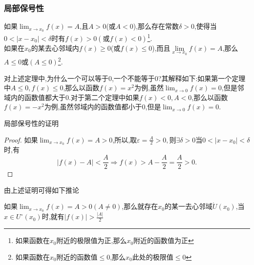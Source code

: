 \documentclass[12pt, a4paper, oneside, UTF8]{ctexbook}  %
\begin{document}
\begin{sloppypar}
    \subsubsection{局部保号性}
    \begin{them}{}{}
        如果$\lim_{x\to x_0}f(x)=A$,且$A>0$(或$A<0$),那么存在常数$\delta>0$,使得当$0<|x-x_0|<\delta$时有$f(x)>0(或f(x)<0)$\footnote{如果函数在$x_0$附近的极限值为正,那么$x_0$附近的函数值为正}.
        \\
        如果在$x_0$的某去心邻域内$f(x)\geqslant 0$(或$f(x)\leqslant 0$),而且$\underset{x\to x_0}{\operatorname*{lim}}f(x)=A$,那么$A \leqslant 0$或$(A \leq 0)$\footnote{如果函数在$x_0$附近的函数值$\leq 0$,那么$x_0$此处的极限值$\le 0$}.
    \end{them}
    对上述定理中,为什么一个可以等于0,一个不能等于0?其解释如下:如果第一个定理中$A \leqslant 0,f(x)\leqslant 0$,那么以函数$f(x)={x^2}$为例,虽然$\lim_{x \to 0}f(x)=0 $,但是邻域内的函数值都大于0.对于第二个定理中如果$f(x) < 0,A< 0$,那么以函数$f(x)={-x^2}$为例,虽然邻域内的函数值都小于0,但是$\lim_{x \to 0}f(x)=0 $.
    \begin{criterion}{局部保号性的证明}{}
        \begin{proof}
            如果$\lim_{x\to x_{0}}f(x)=A > 0$,所以,取$\varepsilon=\frac{A}{2}>0,则\exists \delta >0 $当$0<|x-x_0|<\delta$时,有
            $$
                |f(x)-A|<\frac{A}{2}\Rightarrow f(x)>A-\frac{A}{2}=\frac{A}{2}>0.
            $$
        \end{proof}
    \end{criterion}
    由上述证明可得如下推论
    \begin{corollary}{}{}
        如果$\lim_{x\to x_{0}}f(x)=A > 0(A \neq 0)$,那么就存在$x_0$的某一去心邻域$\mathring{U}\left(x_{0}\right)$,当$x\in U^{\circ}(x_{0})$时,就有$|f(x)|>\frac{|A|}{2}$
    \end{corollary}

\end{sloppypar}
\end{document}
